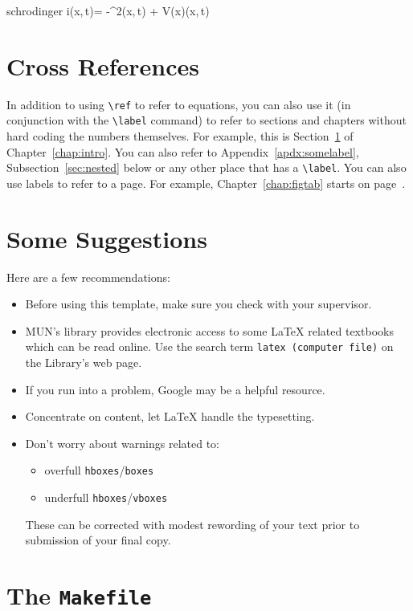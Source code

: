 \begin{muneqn}{schrodinger}
i\hbar {}\Psi(x,\,t)=
-\nabla^2\Psi(x,\,t) + V(x)\Psi(x,\,t)
\end{muneqn}

\section{Cross References}
\label{sec:xrefs}

In addition to using \verb+\ref+ to refer to equations, you can also use
it (in conjunction with the \verb+\label+ command) to refer to sections
and chapters without hard coding the numbers themselves.  For example,
this is Section~\ref{sec:xrefs} of Chapter~\ref{chap:intro}.  You can
also refer to Appendix~\ref{apdx:somelabel}, Subsection~\ref{sec:nested}
below or any other place that has a \verb+\label+.  You can also use
labels to refer to a page.  For example, Chapter~\ref{chap:figtab}
starts on page~\pageref{chap:figtab}.

\section{Some Suggestions}

Here are a few recommendations:

\begin{itemize}
	\item Before using this template, make sure you check with
		your supervisor.
	\item MUN's library provides electronic access to some \LaTeX{}
		related textbooks which can be read online.  Use
		the search term \texttt{latex (computer file)} on the
		Library's web page.
	\item If you run into a problem, Google may be a helpful resource.
	\item Concentrate on content, let \LaTeX{} handle the typesetting.
	\item Don't worry about warnings related to:
	\begin{itemize}
		\item overfull \texttt{hboxes}/\texttt{boxes}
		\item underfull \texttt{hboxes}/\texttt{vboxes}
	\end{itemize}
	These can be corrected with modest rewording of your text prior
	to submission of your final copy.
\end{itemize}

\section{The \texttt{Makefile}}

